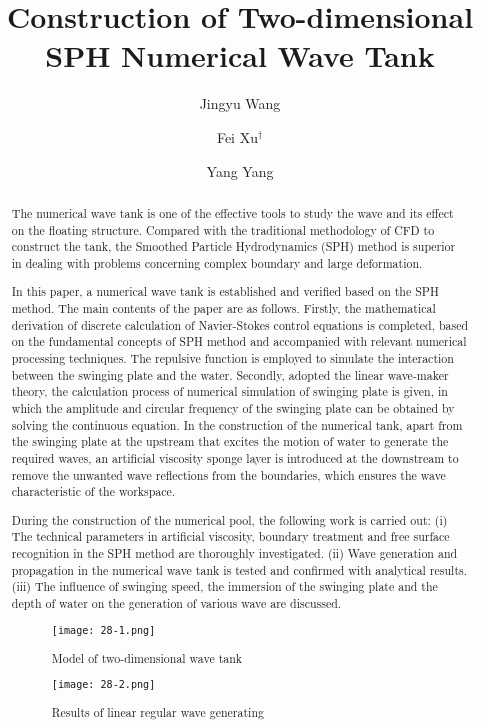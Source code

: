 \documentclass[10pt]{article}
\title{Construction of Two-dimensional SPH Numerical Wave Tank}
\date{}
\author[$\relax$]{Jingyu Wang}
\author[$\relax$]{Fei Xu$^\dagger$}
\author[$\relax$]{Yang Yang}
\affil[$\relax$]{School of Aeronautics, Northwestern Polytechnical University, 710072, Xi'an, P.R.China}
\affil[$\relax$]{\email{\dagger}{xufei@nwpu.edu.cn}}
\begin{document}
\maketitle


\begin{abstract}
The numerical wave tank is one of the effective tools to study the wave and its effect on the floating structure. Compared with the traditional methodology of CFD to construct the tank, the Smoothed Particle Hydrodynamics (SPH) method is superior in dealing with problems concerning complex boundary and large deformation.

In this paper, a numerical wave tank is established and verified based on the SPH method. The main contents of the paper are as follows. Firstly, the mathematical derivation of discrete calculation of Navier-Stokes control equations is completed, based on the fundamental concepts of SPH method and accompanied with relevant numerical processing techniques. The repulsive function is employed to simulate the interaction between the swinging plate and the water. Secondly, adopted the linear wave-maker theory, the calculation process of numerical simulation of swinging plate is given, in which the amplitude and circular frequency of the swinging plate can be obtained by solving the continuous equation. In the construction of the numerical tank, apart from the swinging plate at the upstream that excites the motion of water to generate the required waves, an artificial viscosity sponge layer is introduced at the downstream to remove the unwanted wave reflections from the boundaries, which ensures the wave characteristic of the workspace.

During the construction of the numerical pool, the following work is carried out: (i) The technical parameters in artificial viscosity, boundary treatment and free surface recognition in the SPH method are thoroughly investigated. (ii) Wave generation and propagation in the numerical wave tank is tested and confirmed with analytical results. (iii) The influence of swinging speed, the immersion of the swinging plate and the depth of water on the generation of various wave are discussed.

\begin{figure}[!htb]
\centering
\texttt{[image: 28-1.png]}
\caption{Model of two-dimensional wave tank}\label{fig:28-1}
\end{figure}

\begin{figure}[!htb]
\centering
\texttt{[image: 28-2.png]}
\caption{Results of linear regular wave generating}\label{fig:28-2}
\end{figure}

\end{abstract}



\addbib
\end{document}
